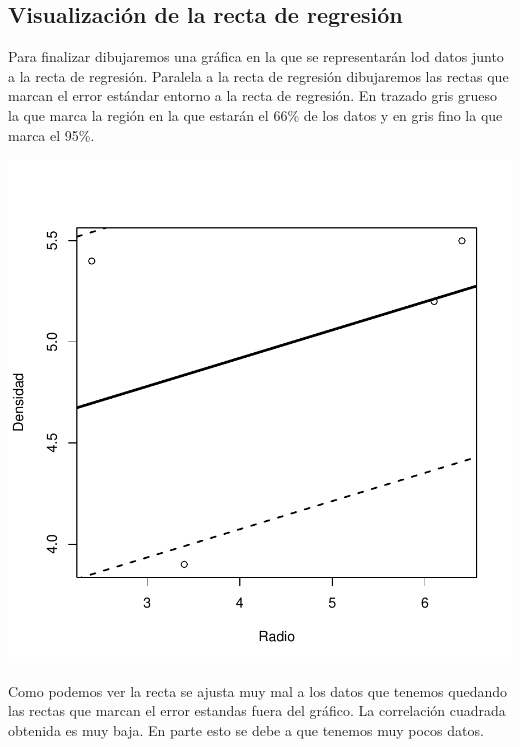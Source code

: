 \documentclass [a4paper] {article}
\begin{document}
\subsection{Visualización de la recta de regresión}
Para finalizar dibujaremos una gráfica en la que se representarán lod datos junto a la recta de regresión.
Paralela a la recta de regresión dibujaremos las rectas que marcan el error estándar entorno a la recta de regresión.
En trazado gris grueso la que marca la región en la que estarán el 66\% de los datos y en gris fino la que marca el 95\%.
\begin{center}
\includegraphics{entrega-plot_regresion2}
\end{center}

Como podemos ver la recta se ajusta muy mal a los datos que tenemos quedando las rectas que marcan el error estandas fuera del gráfico.
La correlación cuadrada obtenida es muy baja.
En parte esto se debe a que tenemos muy pocos datos.

\newpage
\end{document}
